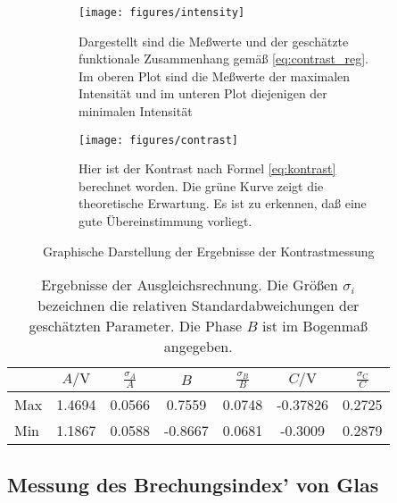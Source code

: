 \begin{figure}
  \centering
  
  \begin{subfigure}{0.8\textwidth}
    \texttt{[image: figures/intensity]}
    \caption{Dargestellt sind die Meßwerte und der geschätzte
      funktionale Zusammenhang gemäß \cref{eq:contrast_reg}.  Im oberen
      Plot sind die Meßwerte der maximalen Intensität und im unteren
      Plot diejenigen der minimalen Intensität}
    \label{fig:intensity}
  \end{subfigure}
  \vspace{5mm}

  \begin{subfigure}{0.8\textwidth}
    \texttt{[image: figures/contrast]}
    \caption{Hier ist der Kontrast nach Formel \eqref{eq:kontrast}
      berechnet worden.  Die grüne Kurve zeigt die theoretische
      Erwartung.  Es ist zu erkennen, daß eine gute Übereinstimmung
      vorliegt.}
    \label{fig:contrast}
  \end{subfigure}

  \caption{Graphische Darstellung der Ergebnisse der Kontrastmessung}
\end{figure}

\begin{table}
  \centering
  \begin{tabular}{lSSSSSS}
    \toprule
    & 
    {$A/\si{\volt}$} & {$\frac{\sigma_A}{A}$} &
    {$B$} & {$\frac{\sigma_B}{B}$} &
    {$C/\si{\volt}$} & {$\frac{\sigma_C}{C}$} \\
    \midrule
    Max &
    1.4694 & 0.0566 & 0.7559 & 0.0748 & -0.37826 & 0.2725 \\
    Min &
    1.1867 & 0.0588 & -0.8667 & 0.0681 & -0.3009 & 0.2879\\
    \bottomrule
  \end{tabular}
  \caption{Ergebnisse der Ausgleichsrechnung.  Die Größen $\sigma_i$
    bezeichnen die relativen Standardabweichungen der geschätzten 
    Parameter.  Die Phase $B$ ist im Bogenmaß angegeben.}
  \label{tab:intensity}
\end{table}

\subsection{Messung des Brechungsindex' von Glas}

